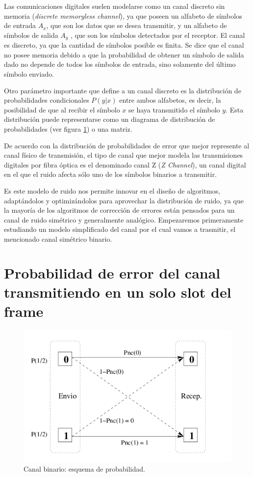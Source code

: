 Las comunicaciones digitales suelen modelarse como un canal discreto sin memoria (\textit{discrete memoryless channel}), ya que poseen un alfabeto de símbolos de entrada $A_{x}$, que son los datos que se desea transmitir, y un alfabeto de símbolos de salida $A_{y}$ , que son los símbolos detectados por el receptor. El canal es discreto, ya que la cantidad de símbolos posible es finita. Se dice que el canal no posee memoria debido a que la probabilidad de obtener un símbolo de salida dado no depende de todos los símbolos de entrada, sino solamente del último símbolo enviado.

Otro parámetro importante que define a un canal discreto es la distribución de probabilidades condicionales $P(y|x)$ entre ambos alfabetos, es decir, la posibilidad de que al recibir el símbolo $x$ se haya transmitido el símbolo $y$. Esta distribución puede representarse como un diagrama de distribución de probabilidades (ver figura \ref{fig:canbin}) o una matriz.

De acuerdo con la distribución de probabilidades de error que mejor represente al canal físico de transmisión, el tipo de canal que mejor modela las transmisiones digitales por fibra óptica es el denominado canal Z (\textit{Z Channel}), un canal digital en el que el ruido afecta sólo uno de los símbolos binarios a transmitir.

Es este modelo de ruido nos permite innovar en el diseño de algoritmos, adaptándolos y optimizándolos para aprovechar la distribución de ruido, ya que la mayoría de los algoritmos de corrección de errores están pensados para un canal de ruido simétrico y generalmente analógico.
Empezaremos primeramente estudiando un modelo simplificado del canal por el cual vamos a trasmitir, el mencionado canal simétrico binario.

\section{Probabilidad de error del canal transmitiendo en un solo slot del frame}

\begin{figure}[t]
  \begin{center}
    \includegraphics[scale=0.50]{graphs/canalBinario.png}
  \end{center}
\caption {Canal binario: esquema de probabilidad.}
\label{fig:canbin}
\end{figure}

